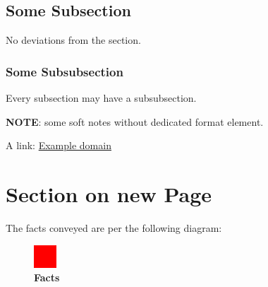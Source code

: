 \documentclass[english,paper=a4,captions=tableheading]{scrartcl}
\begin{document}
\hypertarget{some-subsection}{%
\subsection{Some Subsection}\label{some-subsection}}

No deviations from the section.

\hypertarget{some-subsubsection}{%
\subsubsection{Some Subsubsection}\label{some-subsubsection}}

Every subsection may have a subsubsection.

\textbf{NOTE}: some soft notes without dedicated format element.

A link: \href{https://example.com}{\color{some-blue}Example domain}

\newpage
\hypertarget{section-on-new-page}{%
\section{Section on new Page}\label{section-on-new-page}}

The facts conveyed are per the following diagram:

\setcapindent{0pt}

\begin{figure}
\centering
\includegraphics[width=0.93\linewidth]{images/facts.png}
\caption{\color{heading-color}\textbf{Facts}}
\end{figure}
\end{document}
